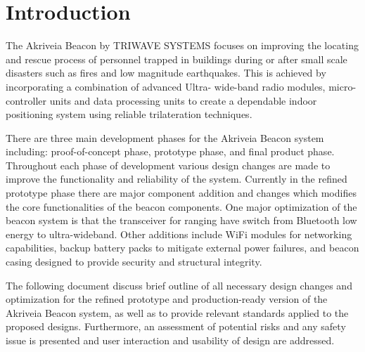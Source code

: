 

\setcounter{section}{0}
\section{Introduction}

\bigskip
The Akriveia Beacon by TRIWAVE SYSTEMS focuses on improving the locating and rescue
process of personnel trapped in buildings during or after small scale disasters such as fires and
low magnitude earthquakes. This is achieved by incorporating a combination of advanced Ultra-
wide-band radio modules, micro-controller units and data processing units to create a dependable
indoor positioning system using reliable trilateration techniques. 

\bigskip
There are three main development phases for the Akriveia Beacon system including: proof-of-concept phase, prototype phase, and final product phase. Throughout each phase of development various design changes are made to improve the functionality and reliability of the system. Currently in the refined prototype phase there are major component addition and changes which modifies the core functionalities of the beacon components. One major optimization of the beacon system is that the transceiver for ranging have switch from  Bluetooth low energy to ultra-wideband. Other additions include WiFi modules for networking capabilities, backup battery packs to mitigate external power failures, and beacon casing designed to provide security and structural integrity. 

\bigskip
The following document discuss brief outline of all necessary design changes and optimization for the refined prototype and production-ready version of the Akriveia Beacon system, as well as to provide relevant standards applied to the proposed designs. Furthermore, an assessment of potential risks and any safety issue is presented and user interaction and usability of design are addressed.

